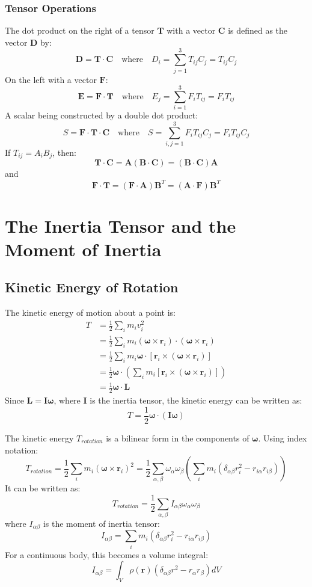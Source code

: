 \documentclass[12pt]{article}
\renewcommand{\vec}[1]{\mathbf{#1}}
\begin{document}
	\subsubsection{Tensor Operations}
	The dot product on the right of a tensor $\mathbf{T}$ with a vector $\vec{C}$ is defined as the vector $\vec{D}$ by:
	\[
	\vec{D} = \mathbf{T} \cdot \vec{C} \quad \text{where} \quad D_i = \sum_{j=1}^3 T_{ij} C_j = T_{ij} C_j
	\]
	On the left with a vector $\vec{F}$:
	\[
	\vec{E} = \vec{F} \cdot \mathbf{T} \quad \text{where} \quad E_j = \sum_{i=1}^3 F_i T_{ij} = F_i T_{ij}
	\]
	A scalar being constructed by a double dot product:
	\[
	S = \vec{F} \cdot \mathbf{T} \cdot \vec{C} \quad \text{where} \quad S = \sum_{i,j=1}^3 F_i T_{ij} C_j = F_i T_{ij} C_j
	\]
	If $T_{ij} = A_i B_j$, then:
	\[
	\mathbf{T} \cdot \vec{C} = \vec{A} (\vec{B} \cdot \vec{C}) = (\vec{B} \cdot \vec{C}) \vec{A}
	\]
	and
	\[
	\vec{F} \cdot \mathbf{T} = (\vec{F} \cdot \vec{A}) \vec{B}^T = (\vec{A} \cdot \vec{F}) \vec{B}^T
	\]
	
	\section{The Inertia Tensor and the Moment of Inertia}
	
	\subsection{Kinetic Energy of Rotation}
	The kinetic energy of motion about a point is:
	\begin{align*}
		T &= \frac{1}{2} \sum_i m_i v_i^2 \\
		&= \frac{1}{2} \sum_i m_i (\vec{\omega} \times \vec{r}_i) \cdot (\vec{\omega} \times \vec{r}_i) \\
		&= \frac{1}{2} \sum_i m_i \vec{\omega} \cdot [\vec{r}_i \times (\vec{\omega} \times \vec{r}_i)] \\
		&= \frac{1}{2} \vec{\omega} \cdot \left( \sum_i m_i [\vec{r}_i \times (\vec{\omega} \times \vec{r}_i)] \right) \\
		&= \frac{1}{2} \vec{\omega} \cdot \vec{L}
	\end{align*}
	Since $\vec{L} = \mathbf{I} \vec{\omega}$, where $\mathbf{I}$ is the inertia tensor, the kinetic energy can be written as:
	\[
	T = \frac{1}{2} \vec{\omega} \cdot (\mathbf{I} \vec{\omega})
	\]
	
	
	The kinetic energy $T_{rotation}$ is a bilinear form in the components of $\vec{\omega}$. Using index notation:
	\[
	T_{rotation} = \frac{1}{2} \sum_i m_i (\vec{\omega} \times \vec{r}_i)^2 = \frac{1}{2} \sum_{\alpha, \beta} \omega_\alpha \omega_\beta \left( \sum_i m_i (\delta_{\alpha\beta} r_i^2 - r_{i\alpha} r_{i\beta}) \right)
	\]
	It can be written as:
	\[
	T_{rotation} = \frac{1}{2} \sum_{\alpha, \beta} I_{\alpha\beta} \omega_\alpha \omega_\beta
	\]
	where $I_{\alpha\beta}$ is the moment of inertia tensor:
	\[
	I_{\alpha\beta} = \sum_i m_i (\delta_{\alpha\beta} r_i^2 - r_{i\alpha} r_{i\beta})
	\]
	For a continuous body, this becomes a volume integral:
	\[
	I_{\alpha\beta} = \int_V \rho(\vec{r}) (\delta_{\alpha\beta} r^2 - r_\alpha r_\beta) dV
	\]
	
\end{document}
